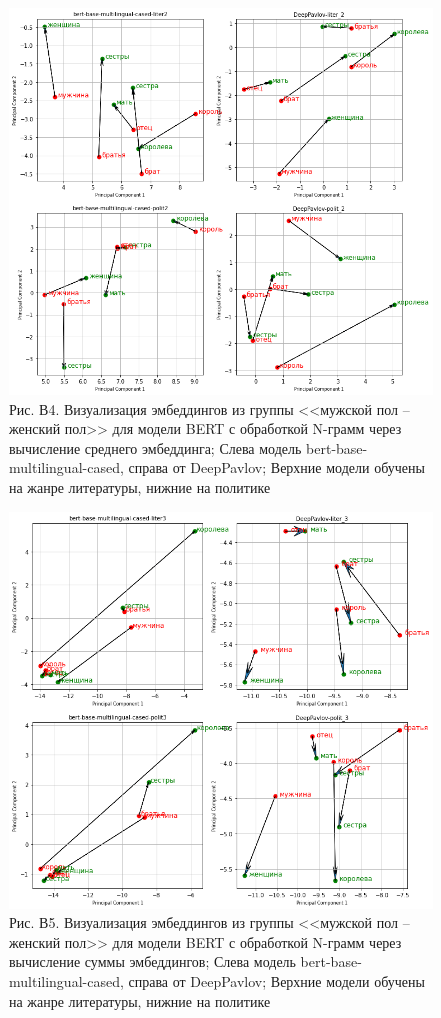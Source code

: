 \documentclass[a4paper,14pt]{article}
\begin{document}
\begin{figure}[H]
	\centering
	\includegraphics[width=0.95\linewidth]{image/fam_2}
	\caption*{Рис. В4. Визуализация эмбеддингов из группы <<мужской пол -- женский пол>> для модели BERT с обработкой N-грамм через вычисление среднего эмбеддинга; Слева модель bert-base-multilingual-cased, справа от DeepPavlov; Верхние модели обучены на жанре литературы, нижние на политике}
	\label{fig:fam2}
\end{figure}

\begin{figure}[H]
	\centering
	\includegraphics[width=0.95\linewidth]{image/fam_3}
	\caption*{Рис. В5. Визуализация эмбеддингов из группы <<мужской пол -- женский пол>> для модели BERT с обработкой N-грамм через вычисление суммы эмбеддингов; Слева модель bert-base-multilingual-cased, справа от DeepPavlov; Верхние модели обучены на жанре литературы, нижние на политике}
	\label{fig:fam3}
\end{figure}
\end{document}
